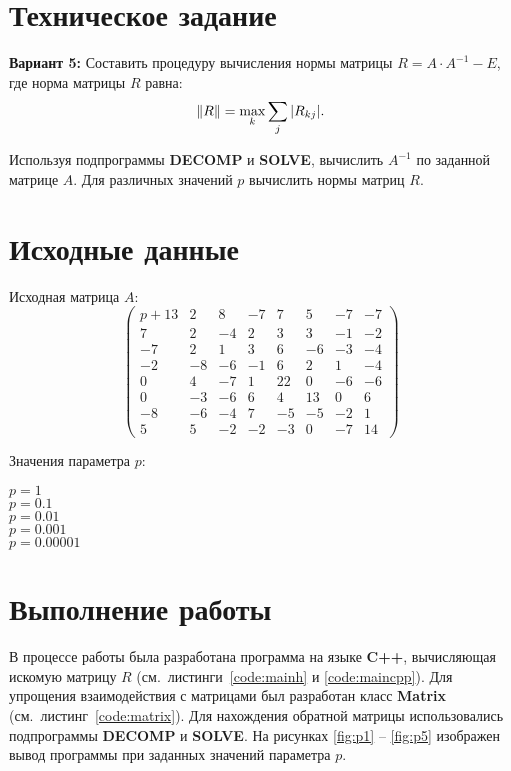 





\section{Техническое задание}

\textbf{Вариант 5:} Составить процедуру вычисления нормы матрицы $R = A\cdot A^{-1} - E$, где норма матрицы $R$ равна:
\[
\left\lVert R\right\rVert = \max_k \sum_j |R_{kj}|.
\]

Используя подпрограммы \textbf{DECOMP} и \textbf{SOLVE}, вычислить $A^{-1}$ по заданной матрице $A$. Для различных значений $p$ вычислить нормы матриц $R$.

\section{Исходные данные}

Исходная матрица $A$:
\[
\begin{pmatrix}
  p+13 & 2  & 8  & -7 & 7  & 5  & -7 & -7 \\
  7    & 2  & -4 & 2  & 3  & 3  & -1 & -2 \\
  -7   & 2  & 1  & 3  & 6  & -6 & -3 & -4 \\
  -2   & -8 & -6 & -1 & 6  & 2  & 1  & -4 \\
  0    & 4  & -7 & 1  & 22 & 0  & -6 & -6 \\
  0    & -3 & -6 & 6  & 4  & 13 & 0  & 6  \\
  -8   & -6 & -4 & 7  & -5 & -5 & -2 & 1  \\
  5    & 5  & -2 & -2 & -3 & 0  & -7 & 14
\end{pmatrix}
\]

Значения параметра $p$:
\begin{multicols}{5} 
	$p = 1$ \\
	$p = 0.1$ \\
	$p = 0.01$ \\
	$p = 0.001$ \\
	$p = 0.00001$
\end{multicols}

\section{Выполнение работы}

В процессе работы была разработана программа на языке \textbf{C++}, вычисляющая искомую матрицу $R$ (см.~листинги~\ref{code:mainh} и \ref{code:maincpp}). Для упрощения взаимодействия с матрицами был разработан класс \textbf{Matrix} (см.~листинг~\ref{code:matrix}). Для нахождения обратной матрицы использовались подпрограммы \textbf{DECOMP} и \textbf{SOLVE}. На рисунках \ref{fig:p1} -- \ref{fig:p5} изображен вывод программы при заданных значений параметра $p$.


